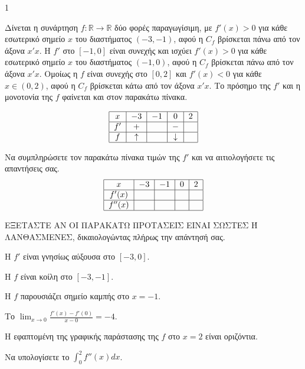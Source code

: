 \begin{ylh}{1}
    \item [Ύλη από εικόνα]
\end{ylh}
Δίνεται η συνάρτηση $f: \mathbb{R} \to \mathbb{R}$ δύο φορές παραγωγίσιμη, με $f'(x) > 0$ για κάθε εσωτερικό σημείο $x$ του διαστήματος $(-3,-1)$, αφού η $C_f$ βρίσκεται πάνω από τον άξονα $x'x$.
Η $f'$ στο $[-1,0]$ είναι συνεχής και ισχύει $f'(x) > 0$ για κάθε εσωτερικό σημείο $x$ του διαστήματος $(-1,0)$, αφού η $C_f$ βρίσκεται πάνω από τον άξονα $x'x$.
Ομοίως η $f$ είναι συνεχής στο $[0,2]$ και $f'(x) < 0$ για κάθε $x \in (0,2)$, αφού η $C_f$ βρίσκεται κάτω από τον άξονα $x'x$.
Το πρόσημο της $f'$ και η μονοτονία της $f$ φαίνεται και στον παρακάτω πίνακα.

\[
\begin{tabular}{|c|c|c|c|c|}
\hline
$x$     & $-3$  & $-1$  & $0$   & $2$   \\ \hline
$f'$    & $+$   &       & $-$   &       \\ \hline
$f$     & $\uparrow$ &       & $\downarrow$ &       \\ \hline
\end{tabular}
\]

\begin{alist}
\item [Α.] Να συμπληρώσετε τον παρακάτω πίνακα τιμών της $f'$ και να αιτιολογήσετε τις απαντήσεις σας. 
\[
\begin{tabular}{|c|c|c|c|c|}
\hline
$x$     & $-3$  & $-1$  & $0$   & $2$   \\ \hline
$f'(x)$ &       &       &       &       \\ \hline
$f''(x)$&       &       &       &       \\ \hline
\end{tabular}
\]

\item [Β.] ΕΞΕΤΑΣΤΕ ΑΝ ΟΙ ΠΑΡΑΚΑΤΩ ΠΡΟΤΑΣΕΙΣ ΕΙΝΑΙ ΣΩΣΤΕΣ Ή ΛΑΝΘΑΣΜΕΝΕΣ, δικαιολογώντας πλήρως την απάντησή σας.
\begin{rlist}
    \item Η $f'$ είναι γνησίως αύξουσα στο $[-3,0]$. 
    \item Η $f$ είναι κοίλη στο $[-3,-1]$. 
    \item Η $f$ παρουσιάζει σημείο καμπής στο $x=-1$. 
    \item Το $\lim_{x \to 0} \frac{f'(x)-f'(0)}{x-0} = -4$. 
    \item Η εφαπτομένη της γραφικής παράστασης της $f$ στο $x=2$ είναι οριζόντια. 
\end{rlist}
\item [Γ.] Να υπολογίσετε το $\int_0^2 f''(x)dx$. 
\end{alist}